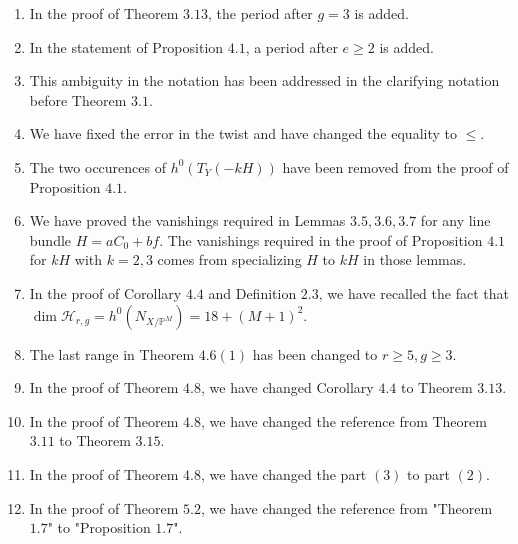 \documentclass[11pt,twoside]{amsart}
\theoremstyle{plain}
\numberwithin{equation}{section}
\theoremstyle{definition}
\begin{document}
\begin{enumerate}
\item[$(31)$] In the proof of Theorem $3.13$, the period after $g = 3$ is added.

\item[$(32)$] In the statement of Proposition $4.1$, a period after $e \geq 2$ is added.

\item[$(33)$] This ambiguity in the notation has been addressed in the clarifying notation before Theorem $3.1$.

\item[$(34)$] We have fixed the error in the twist and have changed the equality to $\leq$.

\item[$(35)$] The two occurences of $h^0(T_Y(-kH))$ have been removed from the proof of Proposition $4.1$.

\item[$(36)$] We have proved the vanishings required in Lemmas $3.5, 3.6, 3.7$ for any line bundle $H = aC_0+bf$. The vanishings required in the proof of Proposition $4.1$ for $kH$ with $k = 2, 3$ comes from specializing $H$ to $kH$ in those lemmas.


\item[$(37)$] In the proof of Corollary $4.4$ and Definition $2.3$, we have recalled the fact that $\operatorname{dim}\mathcal{H}_{r,g} = h^0(N_{X/\mathbb{P}^M}) =  18+(M+1)^2$.

\item[$(38)$] The last range in Theorem $4.6 (1)$ has been changed to $r \geq 5, g \geq 3$. 

\item[$(39)$] In the proof of Theorem $4.8$, we have changed Corollary $4.4$ to Theorem $3.13$.

\item[$(40)$] In the proof of Theorem $4.8$, we have changed the reference from Theorem $3.11$ to Theorem $3.15$. 

\item[$(41)$] In the proof of Theorem $4.8$, we have changed the part $(3)$ to part $(2)$.

\item[$(42)$] In the proof of Theorem $5.2$, we have changed the reference from "Theorem $1.7$" to "Proposition $1.7$".


\end{enumerate}
\end{document}
